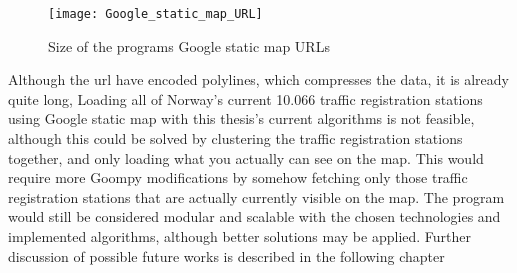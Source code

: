 \begin{figure}[h]
\texttt{[image: Google\_static\_map\_URL]}
\centering
\caption{Size of the programs Google static map URLs}
\label{fig:google_url}
\end{figure}

Although the url have encoded polylines, which compresses the data, it is already quite long, Loading all of Norway's current 10.066 traffic registration stations using Google static map with this thesis's current algorithms is not feasible, although this could be solved by clustering the traffic registration stations together, and only loading what you actually can see on the map. This would require more Goompy modifications by somehow fetching only those traffic registration stations that are actually currently visible on the map.
The program would still be considered modular and scalable with the chosen technologies and implemented algorithms, although better solutions may be applied. Further discussion of possible future works is described in the following chapter